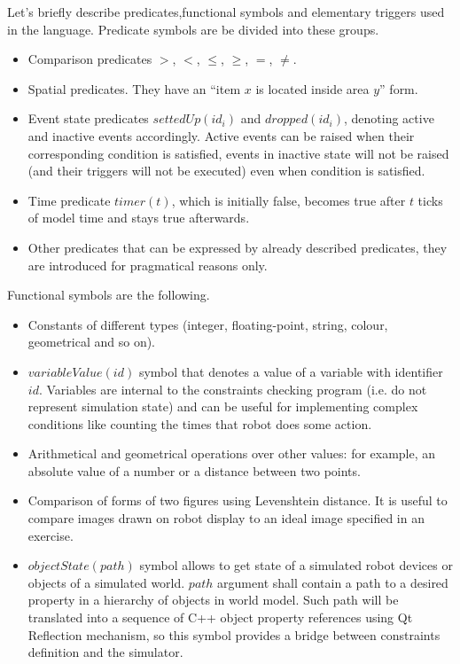 \documentclass[conference]{IEEEtran}
\begin{document}
Let's briefly describe predicates,functional symbols and elementary triggers used in the language. Predicate symbols are be divided into these groups.
\begin{itemize}
    \item Comparison predicates $>$, $<$, $\leq$, $\geq$, $=$, $\neq$.
    \item Spatial predicates. They have an ``item $x$ is located inside area $y$'' form.
    \item Event state predicates $settedUp(id_i)$ and $dropped(id_i)$, denoting active and inactive events accordingly. Active events can be raised when their corresponding condition is satisfied, events in inactive state will not be raised (and their triggers will not be executed) even when condition is satisfied.
    \item Time predicate $timer(t)$, which is initially false, becomes true after $t$ ticks of model time and stays true afterwards.
    \item Other predicates that can be expressed by already described predicates, they are introduced for pragmatical reasons only.
\end{itemize}

Functional symbols are the following.
\begin{itemize}
    \item Constants of different types (integer, floating-point, string, colour, geometrical and so on).
    \item $variableValue(id)$ symbol that denotes a value of a variable with identifier $id$. Variables are internal to the constraints checking program (i.e. do not represent simulation state) and can be useful for implementing complex conditions like counting the times that robot does some action.
    \item Arithmetical and geometrical operations over other values: for example, an absolute value of a number or a distance between two points.
    \item Comparison of forms of two figures using Levenshtein distance. It is useful to compare images drawn on robot display to an ideal image specified in an exercise.
    \item $objectState(path)$ symbol allows to get state of a simulated robot devices or objects of a simulated world. $path$ argument shall contain a path to a desired property in a hierarchy of objects in world model. Such path will be translated into a sequence of C++ object property references using Qt Reflection mechanism, so this symbol provides a bridge between constraints definition and the simulator.
\end{itemize}
\end{document}
